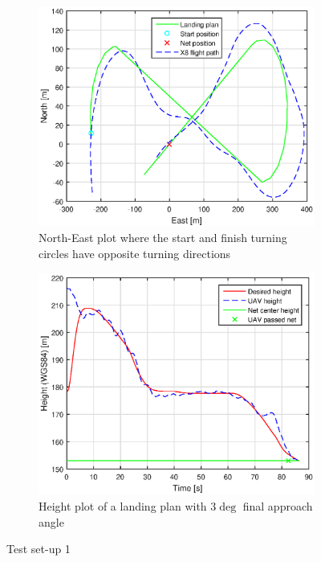 \begin{figure}[H]
\centering
\begin{subfigure}{0.7\textwidth}
		\includegraphics[width=\textwidth]{figs/Experiment/NorthEast31mai103029.eps}
		\caption{North-East plot where the start and finish turning circles have opposite turning directions}
		\label{Fig:NorthEast31mai103029}
\end{subfigure}
\begin{subfigure}{0.7\textwidth}
		\includegraphics[width=\textwidth]{figs/Experiment/Height31mai103029.eps}
		\caption{Height plot of a landing plan with $3 \deg$ final approach angle}
		\label{Fig:Height31mai103029}
\end{subfigure}
\caption{Test set-up 1}
\label{Fig:Test1}
\end{figure}

